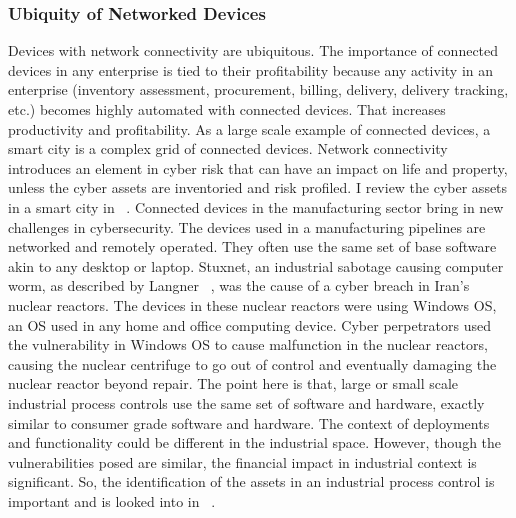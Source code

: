 \subsubsection{Ubiquity of Networked Devices}\label{sec:network_dev}
Devices with network connectivity are ubiquitous. The importance of connected devices in any enterprise is tied to their profitability because any activity in an enterprise (inventory assessment, procurement, billing, delivery, delivery tracking, etc.) becomes highly automated with connected devices. That increases productivity and profitability. As a large scale example of connected devices, a smart city is a complex grid of connected devices. Network connectivity introduces an element in cyber risk that can have an impact on life and property, unless the cyber assets are inventoried and risk profiled. I review the cyber assets in a smart city in ~\cite{7580812}.
Connected devices in the manufacturing sector bring in new challenges in cybersecurity. The devices used in a manufacturing pipelines are networked and remotely operated. They often use the same set of base software akin to any desktop or laptop. Stuxnet, an industrial sabotage causing computer worm, as described by Langner ~\cite{5772960}, was the cause of a cyber breach in Iran's nuclear reactors. The devices in these nuclear reactors were using Windows OS, an OS used in any home and office computing device. Cyber perpetrators used the vulnerability in Windows OS to cause malfunction in the nuclear reactors, causing the nuclear centrifuge to go out of control and  eventually damaging the nuclear reactor beyond repair. The point here is that, large or small scale industrial process controls use the same set of software and hardware, exactly similar to consumer grade software and hardware. The context of deployments and functionality could be different in the industrial space. However, though the vulnerabilities posed are similar, the financial impact in industrial context is significant. So, the identification of the assets in an industrial process control is important and is looked into in ~\cite{7145073}.

